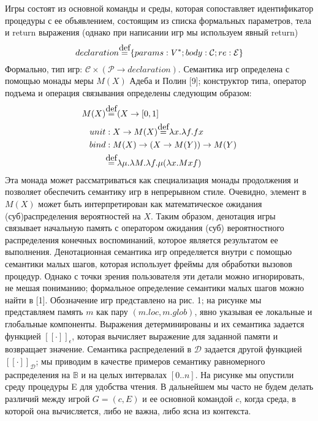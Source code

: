 \documentclass[a4paper,12pt]{report}
\newcommand\myeq{\stackrel{\mathclap{\normalfont\mbox{def}}}{=}}
\begin{document}
\par
Игры состоят из основной команды и среды, которая сопоставляет идентификатор процедуры с ее объявлением, состоящим из списка формальных параметров, тела и return выражения (однако при написании игр мы используем явный return)
\[ declaration \myeq \{ params: V^* ; body : \mathcal{C}; re: \mathcal{E} \} \]
Формально, тип игр: $ \mathcal{C} \times ( \mathcal{P} \rightarrow declaration)$. Семантика игр определена с помощью монады меры $M(X)$ Адеба и Полин [9]; конструктор типа, оператор подъема и операция связывания определены следующим образом:
\begin{align*}
  M(X) &\myeq (X \rightarrow [0, 1] \\
  unit &: X \rightarrow M(X) \myeq \lambda x.\lambda f. f x \\
  bind &: M(X) \rightarrow (X \rightarrow M(Y)) \rightarrow M(Y) \\
       &\myeq \lambda \mu. \lambda M. \lambda f. \mu (\lambda x. M x f)
\end{align*}
Эта монада может рассматриваться как специализация монады продолжения и позволяет обеспечить семантику игр в непрерывном стиле. Очевидно, элемент в $M(X)$ может быть интерпретирован как математическое ожидания (суб)распределения вероятностей на $X$. Таким образом, денотация игры связывает начальную память с оператором ожидания (суб) вероятностного распределения конечных воспоминаний, которое является результатом ее выполнения. Денотационная семантика игр определяется внутри с помощью семантики малых шагов, которая использует фреймы для обработки вызовов процедур. Однако с точки зрения пользователя эти детали можно игнорировать, не мешая пониманию; формальное определение семантики малых шагов можно найти в [1]. Обозначение игр представлено на рис. 1; на рисунке мы представляем память $m$ как пару $(m.loc, m.glob)$, явно указывая ее локальные и глобальные компоненты. Выражения детерминированы и их семантика задается функцией $[\![\cdot]\!]_{\epsilon}$, которая вычисляет выражение для заданной памяти и возвращает значение. Семантика распределений в $\mathcal{D}$ задается другой функцией $[\![\cdot]\!]_{\mathcal{D}}$; мы приводим в качестве примеров семантику равномерного распределения на $\mathbb{B}$ и на целых интервалах $[0..n]$. На рисунке мы опустили среду процедуры E для удобства чтения. В дальнейшем мы часто не будем делать различий между игрой $G = (c, E)$ и ее основной командой $c$, когда среда, в которой она вычисляется, либо не важна, либо ясна из контекста.
\end{document}
